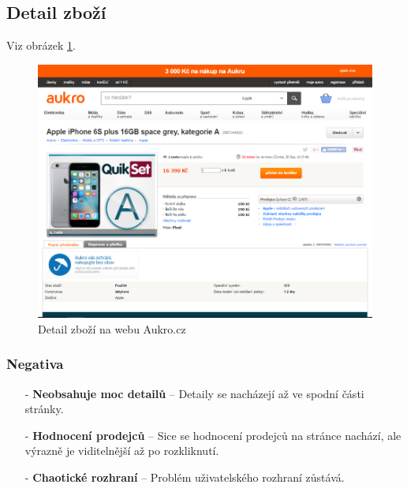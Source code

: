
\newpage
\subsection{Detail zboží}
Viz obrázek \ref{fig:aukro:detail}.
\begin{figure}[h]
    \centering
    \includegraphics[width=1.0\textwidth]{media/aukro/detail.png}
    \caption{Detail zboží na webu Aukro.cz}
    \label{fig:aukro:detail}
\end{figure}
\subsubsection*{Negativa}
\begin{itemize}
    \item[-] \textbf{Neobsahuje moc detailů} -- Detaily se nacházejí až ve spodní části stránky.
    \item[-] \textbf{Hodnocení prodejců} -- Sice se hodnocení prodejců na stránce nachází, ale výrazně je viditelnější až po rozkliknutí.
    \item[-] \textbf{Chaotické rozhraní} -- Problém uživatelského rozhraní zůstává.
\end{itemize}



\newpage
